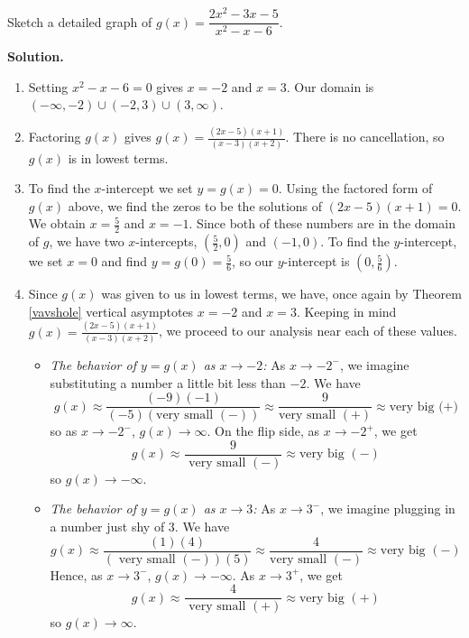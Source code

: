 \begin{ex}  Sketch a detailed graph of $g(x) = \dfrac{2x^2-3x-5}{x^2-x-6}$.

{\bf Solution.}

\begin{enumerate}

\item  Setting $x^2-x-6 = 0$ gives $x = -2$ and $x=3$.  Our domain is $(-\infty, -2) \cup (-2,3) \cup (3,\infty)$.

\item  Factoring $g(x)$ gives $g(x) = \frac{(2x-5)(x+1)}{(x-3)(x+2)}$.  There is no cancellation, so $g(x)$ is in lowest terms.

\item  To find the $x$-intercept  we set $y = g(x) = 0$.  Using the factored form of $g(x)$ above, we find the zeros to be the solutions of $(2x-5)(x+1)=0$.  We obtain $x = \frac{5}{2}$ and $x=-1$. Since both of these numbers are in the domain of $g$, we have two $x$-intercepts, $\left( \frac{5}{2},0\right)$ and $(-1,0)$.  To find the $y$-intercept, we set $x=0$ and find $y = g(0) = \frac{5}{6}$, so our $y$-intercept is $\left(0, \frac{5}{6}\right)$.

\item  Since $g(x)$ was given to us in lowest terms, we have, once again by Theorem \ref{vavshole} vertical asymptotes $x=-2$ and $x=3$.  Keeping in mind $g(x) = \frac{(2x-5)(x+1)}{(x-3)(x+2)}$, we proceed to our analysis near each of these values.

\begin{itemize}

\item  \textit{The behavior of $y=g(x)$ as $x \rightarrow -2$:}  As $x \rightarrow -2^{-}$, we imagine substituting a number a little bit less than $-2$. We have \[g(x) \approx \frac{(-9)(-1)}{(-5)(\mbox{very small $(-)$})} \approx \frac{9}{\mbox{very small $(+)$}} \approx \mbox{very big (+)}\] so as $x \rightarrow -2^{-}$, $g(x) \rightarrow \infty$. On the flip side, as $x \rightarrow -2^{+}$, we get \[g(x) \approx \frac{9}{\mbox{ very small $(-)$}} \approx \mbox{very big $(-)$}\] so $g(x) \rightarrow -\infty$.

\item  \textit{The behavior of $y=g(x)$ as $x \rightarrow 3$:}  As $x \rightarrow 3^{-}$, we imagine plugging in a number just shy  of $3$. We have \[g(x) \approx \frac{(1)(4)}{(\mbox{ very small $(-)$}) (5)} \approx \frac{4}{\mbox{very small $(-)$}} \approx \mbox{very big $(-)$}\] Hence, as $x \rightarrow 3^{-}$, $g(x) \rightarrow -\infty$. As $x \rightarrow 3^{+}$, we get \[g(x) \approx \frac{4}{\mbox{ very small $(+)$}} \approx \mbox{very big $(+)$}\] so $g(x) \rightarrow \infty$.


\end{itemize}
\end{enumerate}
\end{ex}
